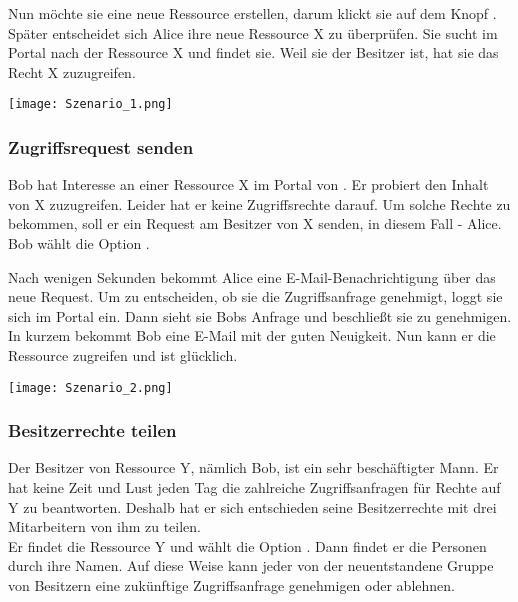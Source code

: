 \documentclass[parskip=full,11pt]{scrartcl}
\begin{document}
Nun möchte sie eine neue Ressource erstellen, darum klickt sie auf dem Knopf \grqq. Später entscheidet sich Alice ihre neue Ressource X zu überprüfen. Sie sucht im Portal nach der Ressource X und findet sie. Weil sie der Besitzer ist, hat sie das Recht X zuzugreifen.\\

	\begin{center}
	\texttt{[image: Szenario\_1.png]}
	\end{center}
\newpage
\subsubsection*{Zugriffsrequest senden}
Bob hat Interesse an einer Ressource X im Portal von \grqq. Er probiert den Inhalt von X zuzugreifen. Leider hat er keine Zugriffsrechte darauf. Um solche Rechte zu bekommen, soll er ein Request am Besitzer von X senden, in diesem Fall - Alice. Bob wählt die Option \grqq. 

Nach wenigen Sekunden bekommt Alice eine E-Mail-Benachrichtigung über das neue Request. Um zu entscheiden, ob sie die Zugriffsanfrage genehmigt, loggt sie sich im Portal ein. Dann sieht sie Bobs Anfrage und beschließt sie zu genehmigen. In kurzem bekommt Bob eine E-Mail mit der guten Neuigkeit. Nun kann er die Ressource zugreifen und ist glücklich.\\
	
	\begin{center}
	\texttt{[image: Szenario\_2.png]}
	\end{center}

\newpage
\subsubsection*{Besitzerrechte teilen}
Der Besitzer von Ressource Y, nämlich Bob, ist ein sehr beschäftigter Mann. Er hat keine Zeit und Lust jeden Tag die zahlreiche Zugriffsanfragen für Rechte auf Y zu beantworten. Deshalb hat er sich entschieden seine Besitzerrechte mit drei Mitarbeitern von ihm zu teilen. \\
Er findet die Ressource Y und wählt die Option \grqq. Dann findet er die Personen durch ihre Namen. Auf diese Weise kann jeder von der neuentstandene Gruppe von Besitzern eine zukünftige Zugriffsanfrage genehmigen oder ablehnen.\\
\end{document}
